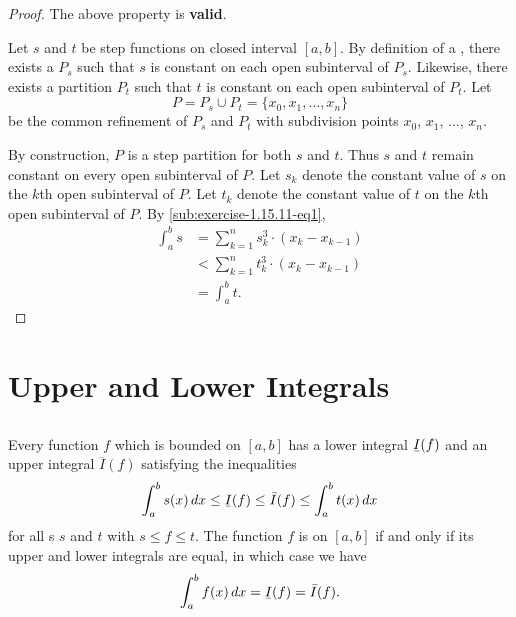 \documentclass{report}
\begin{document}
\begin{proof}

  The above property is \textbf{valid}.

  \vspace{6pt}

  Let $s$ and $t$ be step functions on closed interval $[a, b]$.
  By definition of a , there exists a
     $P_s$ such that $s$ is constant on each open
    subinterval of $P_s$.
  Likewise, there exists a partition $P_t$ such that $t$ is constant on each
    open subinterval of $P_t$.
  Let $$P = P_s \cup P_t = \{x_0, x_1, \ldots, x_n\}$$ be the common refinement
    of $P_s$ and $P_t$ with subdivision points $x_0$, $x_1$, $\ldots$, $x_n$.

  By construction, $P$ is a step partition for both $s$ and $t$.
  Thus $s$ and $t$ remain constant on every open subinterval of $P$.
  Let $s_k$ denote the constant value of $s$ on the $k$th open subinterval of
    $P$.
  Let $t_k$ denote the constant value of $t$ on the $k$th open subinterval of
    $P$.
  By \eqref{sub:exercise-1.15.11-eq1},
    \begin{align*}
      \int_a^b s
        & = \sum_{k=1}^n s_k^3 \cdot (x_k - x_{k-1}) \\
        & < \sum_{k=1}^n t_k^3 \cdot (x_k - x_{k-1}) \\
        & = \int_a^b t.
    \end{align*}

\end{proof}

\section{Upper and Lower Integrals}%
\label{sec:upper-lower-integrals}

\subsection{}%
\label{sub:theorem-1.9}

\begin{theorem}[1.9]

  Every function $f$ which is bounded on $[a, b]$ has a lower integral
    $\ubar{I}(f)$ and an upper integral $\overline{I}(f)$ satisfying the
    inequalities
    \begin{equation}
      \label{sub:theorem-1.9-eq1}
      \int_a^b s(x) \mathop{dx} \leq \ubar{I}(f) \leq
        \bar{I}(f) \leq \int_a^b t(x) \mathop{dx}
    \end{equation}
    for all s $s$ and $t$ with $s \leq f \leq t$.
  The function $f$ is  on $[a, b]$ if and only if
    its upper and lower integrals are equal, in which case we have
    $$\int_a^b f(x) \mathop{dx} = \ubar{I}(f) = \bar{I}(f).$$

\end{theorem}
\end{document}
